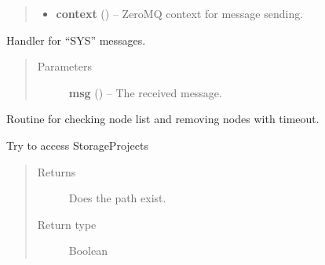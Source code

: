 \documentclass[letterpaper,10pt,english]{sphinxmanual}
\begin{document}
\begin{fulllineitems}
\begin{fulllineitems}
\begin{quote}
\begin{description}
\begin{itemize}
\item {} 
\textbf{context} () -- ZeroMQ context for message sending.

\end{itemize}

\end{description}\end{quote}

\end{fulllineitems}


\begin{fulllineitems}
\label{swnp:swnp.SWNP.sys_handler}
Handler for ``SYS'' messages.
\begin{quote}\begin{description}
\item[{Parameters}] \leavevmode
\textbf{msg} ({\hyperref[swnp:swnp.Message]{}}) -- The received message.

\end{description}\end{quote}

\end{fulllineitems}


\begin{fulllineitems}
\label{swnp:swnp.SWNP.timeout_routine}
Routine for checking node list and removing nodes with timeout.

\end{fulllineitems}


\end{fulllineitems}


\begin{fulllineitems}
\label{swnp:swnp.testStorageConnection}
Try to access StorageProjects
\begin{quote}\begin{description}
\item[{Returns}] \leavevmode
Does the path exist.

\item[{Return type}] \leavevmode
Boolean

\end{description}\end{quote}

\end{fulllineitems}
\end{document}
